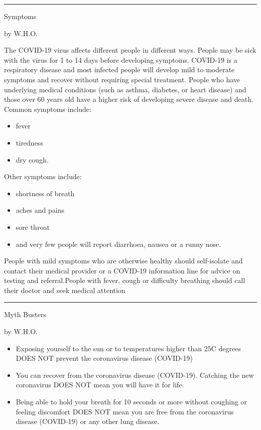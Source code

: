 \documentclass[10pt,a4paper]{article}
\newcommand{\SepRule}{\noindent							 %
						\begin{center}
							\rule{250pt}{1pt}
						\end{center}
						}
\newcommand{\NewsItem}[1]{%
		\usefont{T1}{augie}{m}{n} 	
		\large #1 \vspace{4pt}
		\par \normalsize \normalfont}
\newcommand{\NewsAuthor}[1]{%
			\hfill by \textsc{#1} \vspace{4pt}
			\par \normalfont}
\begin{document}
\vspace{0.5cm}
	\SepRule
\vspace{0.5cm}
\begin{multicols}{2}
	\NewsItem{Symptoms}
	\NewsAuthor{W.H.O.}
	The COVID-19 virus affects different people in different ways. People may be sick with the virus for 1 to 14 days before developing symptoms. COVID-19 is a respiratory disease and most infected people will develop mild to moderate symptoms and recover without requiring special treatment.  People who have underlying medical conditions (such as asthma, diabetes, or heart disease) and those over 60 years old have a higher risk of developing severe disease and death. Common symptoms include:
	\begin{itemize}
	    \item fever
        \item tiredness
        \item dry cough.
	\end{itemize}
    Other symptoms include:
    \begin{itemize}
        \item shortness of breath
        \item aches and pains
        \item sore throat
        \item and very few people will report diarrhoea, nausea or a runny nose.
    \end{itemize}
    People with mild symptoms who are otherwise healthy should self-isolate and contact their medical provider or a COVID-19 information line for advice on testing and referral.\linebreak People with fever, cough or difficulty breathing should call their doctor and seek medical attention
\vspace{0.5cm}
	\SepRule
\vspace{0.5cm}
\NewsItem{Myth Busters}
\NewsAuthor{W.H.O.}
        \begin{itemize}
            \item Exposing yourself to the sun or to temperatures higher than 25C degrees DOES NOT prevent the coronavirus disease (COVID-19)
            \item You can recover from the coronavirus disease (COVID-19). Catching the new coronavirus DOES NOT mean you will have it for life.
            \item Being able to hold your breath for 10 seconds or more without coughing or feeling discomfort DOES NOT mean you are free from the coronavirus disease (COVID-19) or any other lung disease.

\end{itemize}
\end{multicols}
\end{document}
